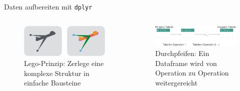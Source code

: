 \begin{frame}{Daten aufbereiten mit \texttt{dplyr}}

\begin{columns}
  \begin{column}{0.49\textwidth}
    
\begin{figure}

{\centering \includegraphics[width=1\linewidth]{../images/Datenjudo/Bausteine_dplyr-crop} 

}

\caption{Lego-Prinzip: Zerlege eine komplexe Struktur in einfache Bausteine}\label{fig:bausteine}
\end{figure}

 \end{column}
  \begin{column}{0.49\textwidth}


\begin{figure}

{\centering \includegraphics[width=1\linewidth]{../images/Datenjudo/durchpfeifen_allgemein_crop} 

}

\caption{Durchpfeifen: Ein Dataframe wird von Operation zu Operation weitergereicht}\label{fig:durchpfeifen-allgemein}
\end{figure}


  \end{column}
\end{columns}

\end{frame}

